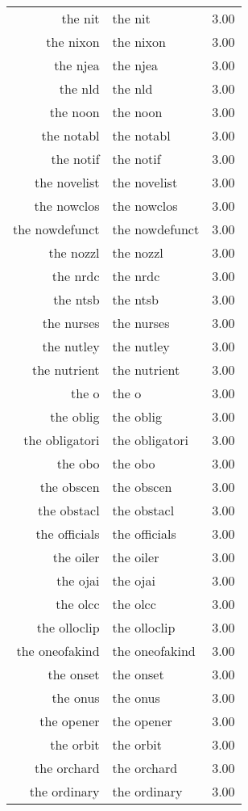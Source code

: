 \begin{table}[ht]
\begin{tabular}{rlr}
  the nit & the nit & 3.00 \\ 
  the nixon & the nixon & 3.00 \\ 
  the njea & the njea & 3.00 \\ 
  the nld & the nld & 3.00 \\ 
  the noon & the noon & 3.00 \\ 
  the notabl & the notabl & 3.00 \\ 
  the notif & the notif & 3.00 \\ 
  the novelist & the novelist & 3.00 \\ 
  the nowclos & the nowclos & 3.00 \\ 
  the nowdefunct & the nowdefunct & 3.00 \\ 
  the nozzl & the nozzl & 3.00 \\ 
  the nrdc & the nrdc & 3.00 \\ 
  the ntsb & the ntsb & 3.00 \\ 
  the nurses & the nurses & 3.00 \\ 
  the nutley & the nutley & 3.00 \\ 
  the nutrient & the nutrient & 3.00 \\ 
  the o & the o & 3.00 \\ 
  the oblig & the oblig & 3.00 \\ 
  the obligatori & the obligatori & 3.00 \\ 
  the obo & the obo & 3.00 \\ 
  the obscen & the obscen & 3.00 \\ 
  the obstacl & the obstacl & 3.00 \\ 
  the officials & the officials & 3.00 \\ 
  the oiler & the oiler & 3.00 \\ 
  the ojai & the ojai & 3.00 \\ 
  the olcc & the olcc & 3.00 \\ 
  the olloclip & the olloclip & 3.00 \\ 
  the oneofakind & the oneofakind & 3.00 \\ 
  the onset & the onset & 3.00 \\ 
  the onus & the onus & 3.00 \\ 
  the opener & the opener & 3.00 \\ 
  the orbit & the orbit & 3.00 \\ 
  the orchard & the orchard & 3.00 \\ 
  the ordinary & the ordinary & 3.00 \\ 

\end{tabular}
\end{table}
